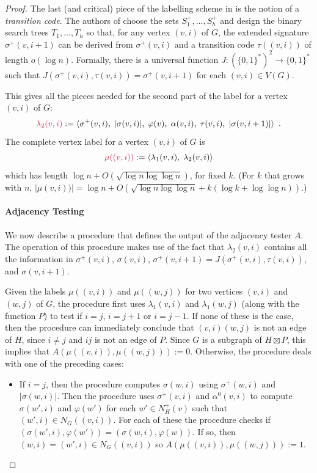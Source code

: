 \documentclass{patmorin}
\makeatletter
\newcommand{\defin}[1]{\emph{\textcolor{brightmaroon}{#1}}}
\def\mathcolor#1#{\@mathcolor{#1}}
\def\@mathcolor#1#2#3{%
  \protect\leavevmode
  \begingroup
    \color#1{#2}#3%
  \endgroup
}
\newcommand{\mathdefin}[1]{\mathcolor{brightmaroon}{#1}}
\newcommand{\Oh}{O}
\makeatother
\begin{document}
\begin{proof}
  The last (and critical) piece of the labelling scheme in \cite{dujmovic.esperet.ea:adjacency} is the notion of a \defin{transition code}. The authors of \cite{dujmovic.esperet.ea:adjacency} choose the sets $S^+_1,\ldots,S^+_h$ and design the binary search trees $T_1,\ldots,T_h$ so that, for any vertex $(v,i)$ of $G$, the extended signature $\sigma^+(v,i+1)$ can be derived from $\sigma^+(v,i)$ and a transition code \defin{$\tau((v,i))$} of length $o(\log n)$. Formally, there is a universal function $J:(\{0,1\}^*)^2\to\{0,1\}^*$ such that $J(\sigma^+(v,i),\tau(v,i))=\sigma^+(v,i+1)$ for each $(v,i)\in V(G)$.

  This gives all the pieces needed for the second part of the label for a vertex $(v,i)$ of $G$:
  \[
    \mathdefin{\lambda_2(v,i)} := \langle \sigma^+(v,i),\; |\sigma(v,i)|,\; \varphi(v),\; \alpha(v,i),\; \tau(v,i),\; |\sigma(v,i+1)| \rangle  \enspace .
  \]
  The complete vertex label for a vertex $(v,i)$ of $G$ is
  \[
    \mathdefin{\mu((v,i))} := \langle \lambda_1(v,i),\; \lambda_2(v,i) \rangle
  \]
  which has length $\log n + O(\sqrt{\log n\log\log n})$, for fixed $k$.  (For $k$ that grows with $n$, $|\mu(v,i))|=\log n + \Oh(\sqrt{\log n\log\log n} + k(\log k + \log\log n))$.)

  \paragraph{Adjacency Testing}

  We now describe a procedure that defines the output of the adjacency tester $A$.
  The operation of this procedure makes use of the fact that $\lambda_2(v,i)$ contains all the information in $\sigma^+(v,i)$, $\sigma(v,i)$, $\sigma^+(v,i+1)=J(\sigma^+(v,i),\tau(v,i))$, and $\sigma(v,i+1)$.

  Given the labels $\mu((v,i))$ and $\mu((w,j))$ for two vertices $(v,i)$ and $(w,j)$ of $G$, the procedure first uses $\lambda_1(v,i)$ and $\lambda_1(w,j)$ (along with the function $P$) to test if $i=j$, $i=j+1$ or $i=j-1$.  If none of these is the case, then the procedure can immediately conclude that $(v,i)(w,j)$ is not an edge of $H$, since $i\neq j$ and $ij$ is not an edge of $P$.  Since $G$ is a subgraph of $H\boxtimes P$, this implies that $A(\mu((v,i)),\mu((w,j))):=0$.  Otherwise, the procedure deals with one of the preceding cases:
  \begin{itemize}
    \item If $i=j$, then the procedure computes $\sigma(w,i)$ using $\sigma^+(w,i)$ and $|\sigma(w,i)|$.  Then the procedure uses $\sigma^+(v,i)$ and $\alpha^0(v,i)$ to compute $\sigma(w',i)$ and $\varphi(w')$ for each $w'\in N^+_H(v)$ such that $(w',i)\in N_G((v,i))$.  For each of these the procedure checks if $(\sigma(w',i),\varphi(w'))=(\sigma(w,i),\varphi(w))$. If so, then $(w,i)=(w',i)\in N_G((v,i))$ so $A(\mu((v,i)),\mu((w,j))):=1$.


\end{itemize}
\end{proof}
\end{document}
